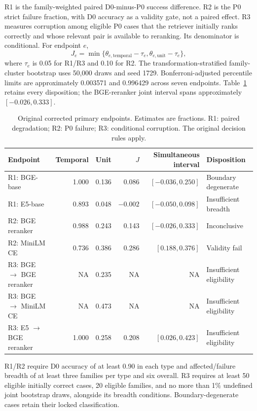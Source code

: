 \documentclass[conference,letterpaper]{IEEEtran}
\newcommand{\NA}{\textsc{NA}}
\begin{document}
R1 is the family-weighted paired D0-minus-P0 success difference. R2 is the P0 strict failure fraction, with D0 accuracy as a validity gate, not a paired effect. R3 measures corruption among eligible P0 cases that the retriever initially ranks correctly and whose relevant pair is available to reranking. Its denominator is conditional. For endpoint $e$,
\begin{equation}
 J_e=\min\{\theta_{e,\mathrm{temporal}}-\tau_e,\theta_{e,\mathrm{unit}}-\tau_e\},
\end{equation}
where $\tau_e$ is 0.05 for R1/R3 and 0.10 for R2. The transformation-stratified family-cluster bootstrap uses 50,000 draws and seed 1729. Bonferroni-adjusted percentile limits are approximately 0.003571 and 0.996429 across seven endpoints. Table~\ref{tab:endpoints} retains every disposition; the BGE-reranker joint interval spans approximately $[-0.026,0.333]$.
\begin{table}[t]
\caption{Original corrected primary endpoints. Estimates are fractions. R1: paired degradation; R2: P0 failure; R3: conditional corruption. The original decision rules apply.}
\label{tab:endpoints}
\centering\small
\begin{tabular}{lrrrrl}
\toprule
Endpoint & Temporal & Unit & $J$ & Simultaneous interval & Disposition \\
\midrule
R1: BGE-base & 1.000 & 0.136 & 0.086 & $[-0.036,0.250]$ & Boundary degenerate \\
R1: E5-base & 0.893 & 0.048 & $-0.002$ & $[-0.050,0.098]$ & Insufficient breadth \\
R2: BGE reranker & 0.988 & 0.243 & 0.143 & $[-0.026,0.333]$ & Inconclusive \\
R2: MiniLM CE & 0.736 & 0.386 & 0.286 & $[0.188,0.376]$ & Validity fail \\
R3: BGE $\to$ BGE reranker & \NA & 0.235 & \NA & \NA & Insufficient eligibility \\
R3: BGE $\to$ MiniLM CE & \NA & 0.473 & \NA & \NA & Insufficient eligibility \\
R3: E5 $\to$ BGE reranker & 1.000 & 0.258 & 0.208 & $[0.026,0.423]$ & Insufficient eligibility \\
\bottomrule
\end{tabular}
\end{table}
R1/R2 require D0 accuracy of at least 0.90 in each type and affected/failure breadth of at least three families per type and six overall. R3 requires at least 50 eligible initially correct cases, 20 eligible families, and no more than 1\% undefined joint bootstrap draws, alongside its breadth conditions. Boundary-degenerate cases retain their locked classification.
\end{document}
